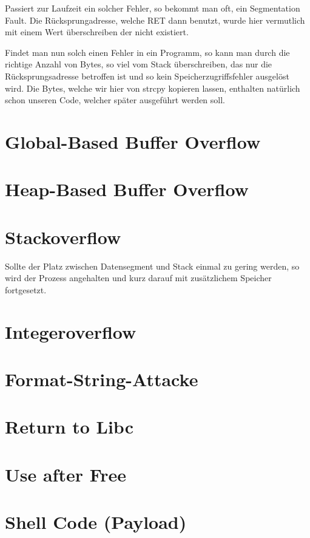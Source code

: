 \documentclass[12pt]{book}
\begin{document}
Passiert zur Laufzeit ein solcher Fehler, so bekommt man oft, ein Segmentation
Fault. Die Rücksprungadresse, welche RET dann benutzt, wurde hier vermutlich mit
einem Wert überschreiben der nicht existiert.

Findet man nun solch einen Fehler in ein Programm, so kann man durch die
richtige Anzahl von Bytes, so viel vom Stack überschreiben, das nur die
Rücksprungsadresse betroffen ist und so kein Speicherzugriffsfehler ausgelöst
wird. Die Bytes, welche wir hier von strcpy kopieren lassen, enthalten natürlich
schon unseren Code, welcher später ausgeführt werden soll.

\section{Global-Based Buffer Overflow}

\section{Heap-Based Buffer Overflow}

\section{Stackoverflow}
Sollte der Platz zwischen Datensegment und Stack einmal zu gering werden, so
wird der Prozess angehalten und kurz darauf mit zusätzlichem Speicher
fortgesetzt.

\section{Integeroverflow}

\section{Format-String-Attacke}

\section{Return to Libc}

\section{Use after Free}

\section{Shell Code (Payload)}
\end{document}
